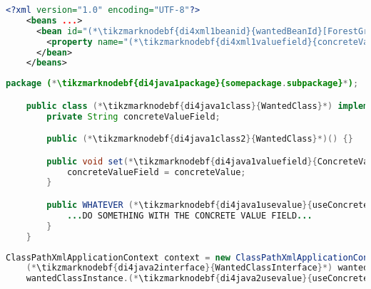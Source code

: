 \begin{lstlisting}[language=XML, title={Configuration XML}]
    <?xml version="1.0" encoding="UTF-8"?>
    <beans ...>
      <bean id="(*\tikzmarknodebf{di4xml1beanid}{wantedBeanId}[ForestGreen]*)" class="(*\tikzmarknodebf{di4xml1package}{somepackage.subpackage}[ForestGreen]*).(*\tikzmarknodebf{di4xml1class}{WantedClass}[ForestGreen]*)">
        <property name="(*\tikzmarknodebf{di4xml1valuefield}{concreteValueField}[ForestGreen]*)" value="someValue"/>
      </bean>
    </beans>
\end{lstlisting}
\begin{lstlisting}[language=Java, title={Wanted class with the zero--parameter constructor and the setter method}]
    package (*\tikzmarknodebf{di4java1package}{somepackage.subpackage}*);

    public class (*\tikzmarknodebf{di4java1class}{WantedClass}*) implements (*\tikzmarknodebf{di4java1interface}{WantedClassInterface}*) {
        private String concreteValueField;

        public (*\tikzmarknodebf{di4java1class2}{WantedClass}*)() {}

        public void set(*\tikzmarknodebf{di4java1valuefield}{ConcreteValueField}*)(String concreteValue) {
            concreteValueField = concreteValue;
        }

        public WHATEVER (*\tikzmarknodebf{di4java1usevalue}{useConcreteValue}*)() {
            ...DO SOMETHING WITH THE CONCRETE VALUE FIELD...
        }
    }
\end{lstlisting}
\begin{lstlisting}[language=Java, title={Usage}]
    ClassPathXmlApplicationContext context = new ClassPathXmlApplicationContext("configurationFile.xml");
    (*\tikzmarknodebf{di4java2interface}{WantedClassInterface}*) wantedClassInstance = context.getBean("(*\tikzmarknodebf{di4java2beanid}{wantedBeanId}[ForestGreen]*)", (*\tikzmarknodebf{di4java2interface2}{WantedClassInterface}*).class);
    wantedClassInstance.(*\tikzmarknodebf{di4java2usevalue}{useConcreteValue}*)();
\end{lstlisting}
\newpage

